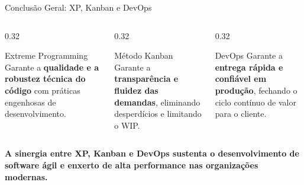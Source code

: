 \documentclass[aspectratio=169, 9pt]{beamer}
\begin{document}
\begin{frame}{Conclusão Geral: XP, Kanban e DevOps}
  \begin{columns}[T]
    \begin{column}{0.32\textwidth}
      \begin{exampleblock}{Extreme Programming}
        Garante a \textbf{qualidade e a robustez técnica do código} com práticas engenhosas de desenvolvimento.
      \end{exampleblock}
    \end{column}

    \begin{column}{0.32\textwidth}
      \begin{block}{Método Kanban}
        Garante a \textbf{transparência e fluidez das demandas}, eliminando desperdícios e limitando o WIP.
      \end{block}
    \end{column}

    \begin{column}{0.32\textwidth}
      \begin{alertblock}{DevOps}
        Garante a \textbf{entrega rápida e confiável em produção}, fechando o ciclo contínuo de valor para o cliente.
      \end{alertblock}
    \end{column}
  \end{columns}

  \vspace{0.4cm}

  \begin{center}
    \small\textbf{\textcolor{structure.fg}{A sinergia entre XP, Kanban e DevOps sustenta o desenvolvimento de software ágil e enxerto de alta performance nas organizações modernas.}}
  \end{center}
\end{frame}
\end{document}

